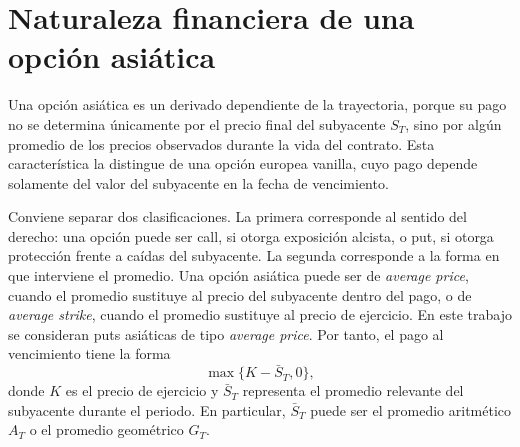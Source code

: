 \documentclass[11pt,letterpaper]{article}
\newcommand{\dd}{\,\mathrm{d}}
\newcommand{\Normal}{\mathcal{N}}
\newcommand{\PhiN}{\Phi}
\begin{document}








\section{Naturaleza financiera de una opción asiática}

Una opción asiática es un derivado dependiente de la trayectoria, porque su pago no se determina únicamente por el precio final del subyacente \(S_T\), sino por algún promedio de los precios observados durante la vida del contrato. Esta característica la distingue de una opción europea vanilla, cuyo pago depende solamente del valor del subyacente en la fecha de vencimiento.

Conviene separar dos clasificaciones. La primera corresponde al sentido del derecho: una opción puede ser call, si otorga exposición alcista, o put, si otorga protección frente a caídas del subyacente. La segunda corresponde a la forma en que interviene el promedio. Una opción asiática puede ser de \emph{average price}, cuando el promedio sustituye al precio del subyacente dentro del pago, o de \emph{average strike}, cuando el promedio sustituye al precio de ejercicio. En este trabajo se consideran puts asiáticas de tipo \emph{average price}. Por tanto, el pago al vencimiento tiene la forma
\begin{equation}
\max\{K-\bar S_T,0\},
\end{equation}
donde \(K\) es el precio de ejercicio y \(\bar S_T\) representa el promedio relevante del subyacente durante el periodo. En particular, \(\bar S_T\) puede ser el promedio aritmético \(A_T\) o el promedio geométrico \(G_T\).
\end{document}
